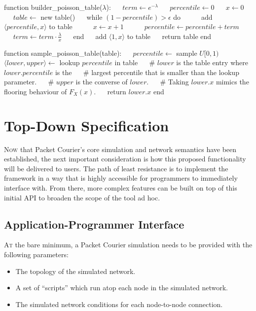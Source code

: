 \newpage

\begin{algorithm}[caption={Poisson distribution builder and sampler.},label={alg:poisson_builder_and_sampler},
    captionpos=b]
    function builder_poisson_table($\lambda$):
    $\quad$ $term \gets e^{-\lambda}$
    $\quad$ $percentile \gets 0$
    $\quad$ $x \gets 0$
    $\quad$ $table \gets$ new table()
    $\quad$ while $(1 - percentile) > \epsilon$ do
    $\quad$ $\quad$ add $\langle percentile, x \rangle$ to table
    $\quad$ $\quad$ $x \gets x + 1$
    $\quad$ $\quad$ $percentile \gets percentile + term$
    $\quad$ $\quad$ $term \gets term \cdot \frac{\lambda}{x}$
    $\quad$ end
    $\quad$ add  $\langle 1, x \rangle$ to table
    $\quad$ return table
    end

    function sample_poisson_table(table):
    $\quad$ $percentile \gets$ sample $U[0, 1)$
    $\quad$ $\langle lower, upper \rangle \gets$ lookup $percentile$ in table
    $\quad$ # $lower$ is the table entry where $lower.percentile$ is the
    $\quad$ # largest percentile that is smaller than the lookup parameter.
    $\quad$ # $upper$ is the converse of $lower$.
    $\quad$ # Taking $lower.x$ mimics the flooring behaviour of $F_X(x)$.
    $\quad$ return $lower.x$
    end
\end{algorithm}


\section{Top-Down Specification}\label{section:top_down_specification}

\lettrine{N}{ow} that Packet Courier's core simulation and network semantics have been established, the next
important consideration is how this proposed functionality will be delivered to users. The path of least resistance
is to implement the framework in a way that is highly accessible for programmers to immediately interface with. From
there, more complex features can be built on top of this initial API to broaden the scope of the tool ad hoc.

\subsection{Application-Programmer Interface}\label{subsection:application_programmer_interface}

\lettrine{A}{t} the bare minimum, a Packet Courier simulation needs to be provided with the following parameters:
\begin{itemize}
    \item The topology of the simulated network.
    \item A set of ``scripts'' which run atop each node in the simulated network.
    \item The simulated network conditions for each node-to-node connection.
\end{itemize}

